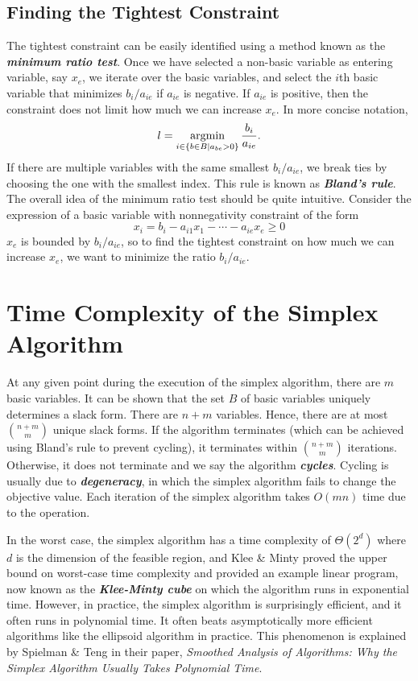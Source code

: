 \subsection{Finding the Tightest Constraint} 

The tightest constraint can be easily identified using a method known as the \textit{\textbf{minimum ratio test}}. Once we have selected a non-basic variable as entering variable, say $x_e$, we iterate over the basic variables, and select the $i$th basic variable that minimizes $b_i/a_{ie}$ if $a_{ie}$ is negative. If $a_{ie}$ is positive, then the constraint does not limit how much we can increase $x_e$. In more concise notation, 
$$
l = \operatorname*{\mathrm{argmin}}_{i \in \{b \in B \mid a_{be} > 0\}} \frac{b_i}{a_{ie}}.
$$
If there are multiple variables with the same smallest $b_i/a_{ie}$, we break ties by choosing the one with the smallest index. This rule is known as \textit{\textbf{Bland's rule}}. The overall idea of the minimum ratio test should be quite intuitive. Consider the expression of a basic variable with nonnegativity constraint of the form 
$$
x_i = b_i - a_{i1} x_1 - \cdots - a_{ie} x_e \geq 0
$$
$x_e$ is bounded by $b_i/a_{ie}$, so to find the tightest constraint on how much we can increase $x_e$, we want to minimize the ratio $b_i/a_{ie}$.

\section{Time Complexity of the Simplex Algorithm}  

At any given point during the execution of the simplex algorithm, there are $m$ basic variables. It can be shown that the set $B$ of basic variables uniquely determines a slack form. There are $n+m$ variables. Hence, there are at most ${n+m \choose m}$ unique slack forms. If the algorithm terminates (which can be achieved using Bland's rule to prevent cycling), it terminates within ${n+m \choose m}$ iterations. Otherwise, it does not terminate and we say the algorithm \textit{\textbf{cycles}}. Cycling is usually due to \textit{\textbf{degeneracy}}, in which the simplex algorithm fails to change the objective value. Each iteration of the simplex algorithm takes $O(mn)$ time due to the  operation.

In the worst case, the simplex algorithm has a time complexity of $\Theta(2^d)$ where $d$ is the dimension of the feasible region, and Klee \& Minty proved the upper bound on worst-case time complexity and provided an example linear program, now known as the \textit{\textbf{Klee-Minty cube}} on which the algorithm runs in exponential time. However, in practice, the simplex algorithm is surprisingly efficient, and it often runs in polynomial time. It often beats asymptotically more efficient algorithms like the ellipsoid algorithm in practice. This phenomenon is explained by Spielman \& Teng in their paper, \textit{Smoothed Analysis of Algorithms: Why the Simplex Algorithm Usually Takes Polynomial Time}.